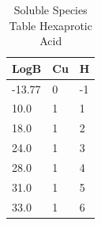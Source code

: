 \documentclass[a4paper, 12pt]{article}
\begin{document}
\begin{table}[h!]
\centering
\begin{tabular}{|l|l|l|}
\hline
    \textbf{LogB}   & \textbf{Cu} & \textbf{H}  \\ \hline
    -13.77 & 0  & -1 \\ \hline
    10.0   & 1  & 1  \\ \hline
    18.0   & 1  & 2  \\ \hline
    24.0   & 1  & 3  \\ \hline
    28.0   & 1  & 4  \\ \hline
    31.0   & 1  & 5  \\ \hline
    33.0   & 1  & 6  \\ \hline   
\end{tabular}
\caption{Soluble Species Table Hexaprotic Acid}
\label{tab:species_hexa}
\end{table}
\end{document}
